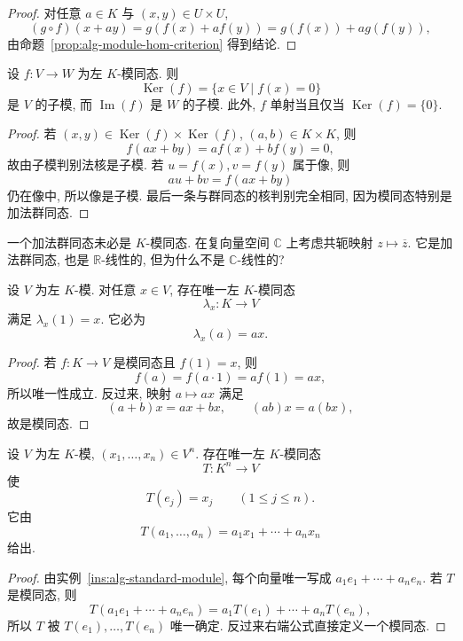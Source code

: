 \documentclass[usesamecnt, thmcnt=section, lang=cn, newtx, 10pt, scheme=chinese]{elegantbook}
\begin{document}
\begin{proof}
对任意 $a\in K$ 与 $(x,y)\in U\times U$,
\[
 (g\circ f)(x+ay)
 =g(f(x)+af(y))
 =g(f(x))+ag(f(y)),
\]
由命题~\ref{prop:alg-module-hom-criterion} 得到结论.
\end{proof}

\begin{proposition}\label{prop:alg-module-kernel-image}
设 $f:V\to W$ 为左 $K$-模同态. 则
\[
 \operatorname{Ker}(f)=\{x\in V\mid f(x)=0\}
\]
是 $V$ 的子模, 而 $\operatorname{Im}(f)$ 是 $W$ 的子模. 此外, $f$ 单射当且仅当 $\operatorname{Ker}(f)=\{0\}$.
\end{proposition}

\begin{proof}
若 $(x,y)\in\operatorname{Ker}(f)\times\operatorname{Ker}(f)$, $(a,b)\in K\times K$, 则
\[
 f(ax+by)=af(x)+bf(y)=0,
\]
故由子模判别法核是子模. 若 $u=f(x),v=f(y)$ 属于像, 则
\[
 au+bv=f(ax+by)
\]
仍在像中, 所以像是子模. 最后一条与群同态的核判别完全相同, 因为模同态特别是加法群同态.
\end{proof}

\begin{exercise}\label{ex:alg-module-linearity-needed}
一个加法群同态未必是 $K$-模同态. 在复向量空间 $\mathbb C$ 上考虑共轭映射 $z\mapsto\overline z$. 它是加法群同态, 也是 $\mathbb R$-线性的, 但为什么不是 $\mathbb C$-线性的?
\end{exercise}

\begin{proposition}\label{prop:alg-module-universal-K}
设 $V$ 为左 $K$-模. 对任意 $x\in V$, 存在唯一左 $K$-模同态
\[
 \lambda_x:K\longrightarrow V
\]
满足 $\lambda_x(1)=x$. 它必为
\[
 \lambda_x(a)=ax.
\]
\end{proposition}

\begin{proof}
若 $f:K\to V$ 是模同态且 $f(1)=x$, 则
\[
 f(a)=f(a\cdot1)=af(1)=ax,
\]
所以唯一性成立. 反过来, 映射 $a\mapsto ax$ 满足
\[
 (a+b)x=ax+bx,
 \qquad
 (ab)x=a(bx),
\]
故是模同态.
\end{proof}

\begin{corollary}\label{cor:alg-module-universal-Kn}
设 $V$ 为左 $K$-模, $(x_1,\ldots,x_n)\in V^n$. 存在唯一左 $K$-模同态
\[
 T:K^n\longrightarrow V
\]
使
\[
 T(e_j)=x_j
 \qquad(1\leq j\leq n).
\]
它由
\[
 T(a_1,\ldots,a_n)
 =a_1x_1+\cdots+a_nx_n
\]
给出.
\end{corollary}

\begin{proof}
由实例~\ref{ins:alg-standard-module}, 每个向量唯一写成 $a_1e_1+\cdots+a_ne_n$. 若 $T$ 是模同态, 则
\[
 T(a_1e_1+\cdots+a_ne_n)
 =a_1T(e_1)+\cdots+a_nT(e_n),
\]
所以 $T$ 被 $T(e_1),\ldots,T(e_n)$ 唯一确定. 反过来右端公式直接定义一个模同态.
\end{proof}
\end{document}
